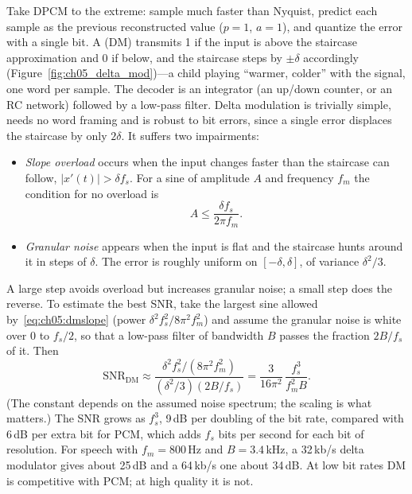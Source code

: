 Take DPCM to the extreme: sample much faster than Nyquist, predict each sample as the previous
reconstructed value ($p=1$, $a=1$), and quantize the error with a single bit. A  (DM) transmits 1 if the input is above the staircase approximation and 0 if below,
and the staircase steps by $\pm\delta$ accordingly (Figure~\ref{fig:ch05_delta_mod})---a child
playing ``warmer, colder'' with the signal, one word per sample. The decoder is an integrator (an
up/down counter, or an RC network) followed by a low-pass filter. Delta modulation is trivially
simple, needs no word framing and is robust to bit errors, since a single error displaces the
staircase by only $2\delta$. It suffers two impairments:
\begin{itemize}
\item \emph{Slope overload} occurs when the input changes faster than the staircase can follow,
$|x'(t)|>\delta f_s$. For a sine of amplitude $A$ and frequency $f_m$ the condition for no
overload is
\begin{equation}
A\le\frac{\delta f_s}{2\pi f_m}.
\label{eq:ch05:dmslope}
\end{equation}
\item \emph{Granular noise} appears when the input is flat and the staircase hunts around it
in steps of $\delta$. The error is roughly uniform on $[-\delta,\delta]$, of variance $\delta^2/3$.
\end{itemize}
A large step avoids overload but increases granular noise; a small step does the reverse. To
estimate the best SNR, take the largest sine allowed by~\eqref{eq:ch05:dmslope} (power
$\delta^2f_s^2/8\pi^2f_m^2$) and assume the granular noise is white over $0$ to $f_s/2$, so that
a low-pass filter of bandwidth $B$ passes the fraction $2B/f_s$ of it. Then
\begin{equation}
\text{SNR}_{\text{DM}}\approx\frac{\delta^2f_s^2/(8\pi^2f_m^2)}{(\delta^2/3)(2B/f_s)}
=\frac{3}{16\pi^2}\,\frac{f_s^3}{f_m^2B}.
\label{eq:ch05:dmsnr}
\end{equation}
(The constant depends on the assumed noise spectrum; the scaling is what matters.) The SNR grows
as $f_s^3$, 9\,dB per doubling of the bit rate, compared with 6\,dB per extra bit for PCM, which
adds $f_s$ bits per second for each bit of resolution. For speech with $f_m=800$\,Hz and
$B=3.4$\,kHz, a 32\,kb/s delta modulator gives about 25\,dB and a 64\,kb/s one about 34\,dB.
At low bit rates DM is competitive with PCM; at high quality it is not.



